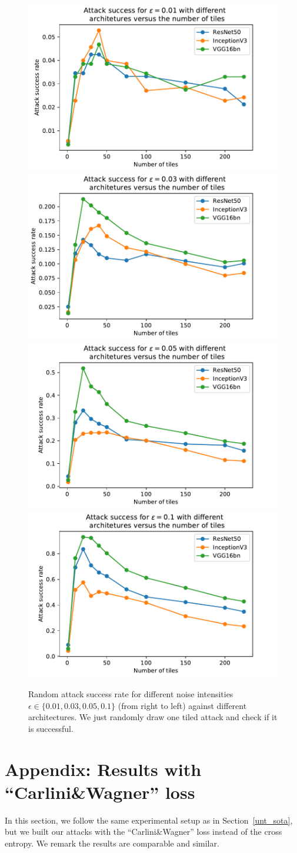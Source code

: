 \begin{figure}[htb]
\centering
\includegraphics[width=.23\textwidth]{sections/appendix/arxiv_dfo/images/rand_001.pdf}
\includegraphics[width=.23\textwidth]{sections/appendix/arxiv_dfo/images/rand_003.pdf}
\includegraphics[width=.23\textwidth]{sections/appendix/arxiv_dfo/images/rand_005.pdf}
\includegraphics[width=.23\textwidth]{sections/appendix/arxiv_dfo/images/rand_01.pdf}\\
\caption{\label{til2}Random attack success rate for different noise intensities $\epsilon\in\{0.01,0.03,0.05,0.1\}$ (from right to left) against different architectures. We just randomly draw one tiled attack and check if it is successful.}
\end{figure}
\newpage
\section{Appendix: Results with ``Carlini\&Wagner'' loss}
\label{cwsec}
In this section, we follow the same experimental setup as in Section~\ref{unt_sota}, but we built our attacks with the ``Carlini\&Wagner'' loss instead of the cross entropy. We remark the results are comparable and similar.

